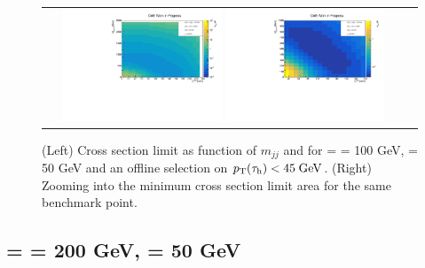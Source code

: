 \begin{figure}[tbh!]
	\centering
	\begin{tabular}{cc}
		\includegraphics[width=0.45\textwidth]{analysis/pics/JetInvMass_vs_MET_xsec_chi100_lsp050_taupt45.pdf}
		\includegraphics[width=0.45\textwidth]{analysis/pics/JetInvMass_vs_MET_xsec_chi100_lsp050_taupt45_zoom.pdf} 		
	\end{tabular}
	\caption{(Left) Cross section limit as function of $m_{jj}$ and \met for \charginopm = \neutralinotwo = 100 GeV, \neutralinoone = 50 GeV and an offline selection on $p_{\text{T}}(\tau_{\text{h}}) <  45\;\text{Ge}\kern-0.06667em\text{V}$. (Right) Zooming into the minimum cross section limit area for the same benchmark point.}
	\label{fig::JetInvMass_vs_MET_xsec_chi100_lsp050_taupt45}
\end{figure}

\FloatBarrier

\subsection*{\charginopm = \neutralinotwo = 200 GeV, \neutralinoone = 50 GeV}

\FloatBarrier

